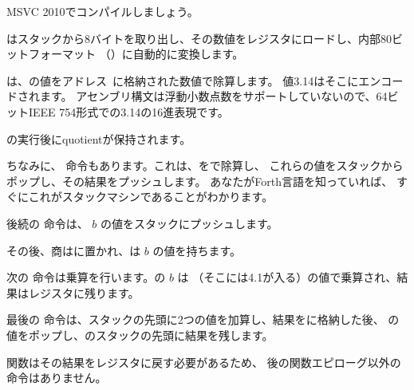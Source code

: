 ﻿

MSVC 2010でコンパイルしましょう。



\FLD はスタックから8バイトを取り出し、その数値をレジスタにロードし、内部80ビットフォーマット
（）に自動的に変換します。


\FDIV は、の値をアドレス~に格納された数値で除算します。
値3.14はそこにエンコードされます。
アセンブリ構文は浮動小数点数をサポートしていないので、64ビットIEEE 754形式での3.14の16進表現です。

\FDIV {}の実行後に\gls{quotient}が保持されます。


ちなみに、 \FDIVP 命令もあります。これは、をで除算し、
これらの値をスタックからポップし、その結果をプッシュします。
あなたがForth言語\FNURLFORTH を知っていれば、
すぐにこれがスタックマシン\FNURLSTACK であることがわかります。

後続の \FLD 命令は、 $b$ の値をスタックにプッシュします。

その後、商はに置かれ、は $b$ の値を持ちます。


次の \FMUL 命令は乗算を行います。の $b$ は
（そこには4.1が入る）の値で乗算され、結果はレジスタに残ります。


最後の \FADDP 命令は、スタックの先頭に2つの値を加算し、結果をに格納した後、
の値をポップし、のスタックの先頭に結果を残します。

関数はその結果をレジスタに戻す必要があるため、
\FADDP 後の関数エピローグ以外の命令はありません。


